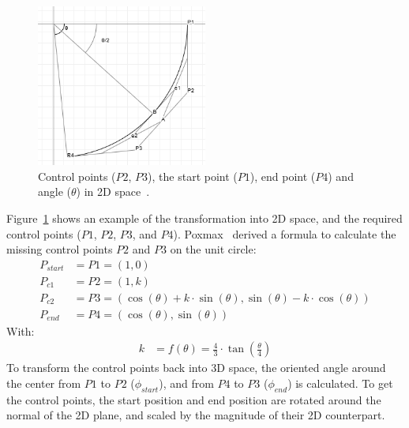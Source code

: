 \begin{figure}[h]
    \centering
    \includegraphics[width=0.5\textwidth]{content/4_3_autoNavigation/img/CircularCurveParameters}
    \caption{Control points ($P2$, $P3$), the start point ($P1$), end point ($P4$) and angle ($\theta$) in 2D
    space~\cite{Poxmax2021}.}
    \label{fig:orbital-control-points}
\end{figure}

Figure~\ref{fig:orbital-control-points} shows an example of the transformation into 2D space, and the required
control points ($P1$, $P2$, $P3$, and $P4$).
Poxmax~\cite{Poxmax2021} derived a formula to calculate the missing control points $P2$ and $P3$ on the unit circle:
\begin{equation}
    \label{eq:control-points}
    \begin{aligned}
        P_{start} &= P1 = (1, 0) \\
        P_{c1} &= P2 = (1, k) \\
        P_{c2} &= P3 = (\cos(\theta) + k \cdot \sin(\theta), \sin(\theta) - k \cdot \cos(\theta)) \\
        P_{end} &= P4 = (\cos(\theta), \sin(\theta))
    \end{aligned}
\end{equation}
With:
\begin{equation}
    \label{eq:control-points-factor}
    \begin{aligned}
        k &= f(\theta) = \frac{4}{3} \cdot \tan\left( \frac{\theta}{4} \right)
    \end{aligned}
\end{equation}
To transform the control points back into 3D space, the oriented angle around the center from $P1$ to $P2$
($\phi_{start}$), and from $P4$ to $P3$ ($\phi_{end}$) is calculated.
To get the control points, the start position and end position are rotated around the normal of the 2D plane, and
scaled by the magnitude of their 2D counterpart.


